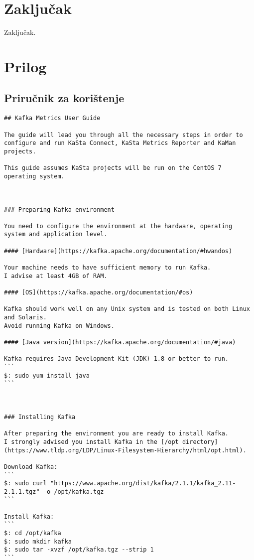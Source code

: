 \documentclass[times, utf8, diplomski, numeric]{fer}
\begin{document}
\chapter{Zaključak}
Zaključak.

\chapter{Prilog}

\section{Priručnik za korištenje}
\begin{lstlisting}[breaklines]
## Kafka Metrics User Guide

The guide will lead you through all the necessary steps in order to configure and run KaSta Connect, KaSta Metrics Reporter and KaMan projects.  

This guide assumes KaSta projects will be run on the CentOS 7 operating system.



### Preparing Kafka environment

You need to configure the environment at the hardware, operating system and application level.  

#### [Hardware](https://kafka.apache.org/documentation/#hwandos)

Your machine needs to have sufficient memory to run Kafka.  
I advise at least 4GB of RAM.  

#### [OS](https://kafka.apache.org/documentation/#os)

Kafka should work well on any Unix system and is tested on both Linux and Solaris.  
Avoid running Kafka on Windows.  

#### [Java version](https://kafka.apache.org/documentation/#java)

Kafka requires Java Development Kit (JDK) 1.8 or better to run.  
```
$: sudo yum install java
```



### Installing Kafka

After preparing the environment you are ready to install Kafka.  
I strongly advised you install Kafka in the [/opt directory](https://www.tldp.org/LDP/Linux-Filesystem-Hierarchy/html/opt.html).  

Download Kafka:  
```
$: sudo curl "https://www.apache.org/dist/kafka/2.1.1/kafka_2.11-2.1.1.tgz" -o /opt/kafka.tgz
```

Install Kafka:  
```
$: cd /opt/kafka
$: sudo mkdir kafka
$: sudo tar -xvzf /opt/kafka.tgz --strip 1
```


\end{lstlisting}
\end{document}
